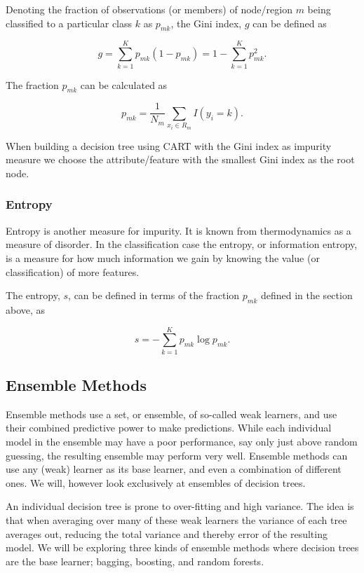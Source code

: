 \documentclass[11pt]{article}
\begin{document}
Denoting the fraction of observations (or members) of node/region \(m\)
being classified to a particular class \(k\) as \(p_{mk}\), the Gini
index, \(g\) can be defined as

    \[
g = \sum_{k=1}^K p_{mk}(1-p_{mk}) = 1-\sum_{k=1}^K p_{mk}^2.
\]

    The fraction \(p_{mk}\) can be calculated as

    \[
p_{mk} = \frac{1}{N_m}\sum_{x_i\in R_m}I(y_i=k).
\]

    When building a decision tree using CART with the Gini index as impurity
measure we choose the attribute/feature with the smallest Gini index as
the root node.

    \hypertarget{entropy}{%
\subsubsection{Entropy}\label{entropy}}

Entropy is another measure for impurity. It is known from thermodynamics
as a measure of disorder. In the classification case the entropy, or
information entropy, is a measure for how much information we gain by
knowing the value (or classification) of more features.

The entropy, \(s\), can be defined in terms of the fraction \(p_{mk}\)
defined in the section above, as

    \[
s = -\sum_{k=1}^K p_{mk}\log{p_{mk}}.
\]

    \hypertarget{ensemble-methods}{%
\subsection{Ensemble Methods}\label{ensemble-methods}}

Ensemble methods use a set, or ensemble, of so-called weak learners, and
use their combined predictive power to make predictions. While each
individual model in the ensemble may have a poor performance, say only
just above random guessing, the resulting ensemble may perform very
well. Ensemble methods can use any (weak) learner as its base learner, and even a combination of different ones. We will, however look exclusively at ensembles of decision trees.

An individual decision tree is prone to over-fitting and high
variance. The idea is that when averaging over many of these weak
learners the variance of each tree averages out, reducing the total
variance and thereby error of the resulting model. We will be exploring three kinds of ensemble methods where
decision trees are the base learner; bagging, boosting, and random
forests.
\end{document}
